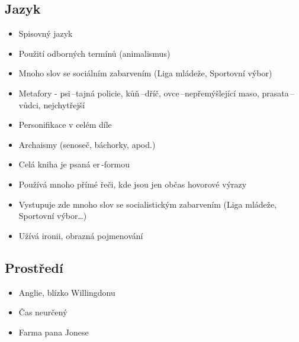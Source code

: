 \documentclass{article}
\begin{document}
\subsection{Jazyk}
\begin{itemize}
    \item Spisovný jazyk
    \item Použití odborných termínů (animalismus)
    \item Mnoho slov se sociálním zabarvením (Liga mládeže, Sportovní výbor)
    \item Metafory - psi\,–tajná policie, kůň\,–dříč, ovce\,–nepřemýšlející maso, prasata\,–vůdci, nejchytřejší
    \item Personifikace v celém díle
    \item Archaismy (senoseč, báchorky, apod.)
    \item Celá kniha je psaná er\,-formou
    \item Používá mnoho přímé řeči, kde jsou jen občas hovorové výrazy
    \item Vystupuje zde mnoho slov se socialistickým zabarvením (Liga mládeže, Sportovní výbor…)
    \item Užívá ironii, obrazná pojmenování
\end{itemize}

\subsection{Prostředí}
\begin{itemize}
    \item Anglie, blízko Willingdonu
    \item Čas neurčený
    \item Farma pana Jonese
\end{itemize}
\end{document}
